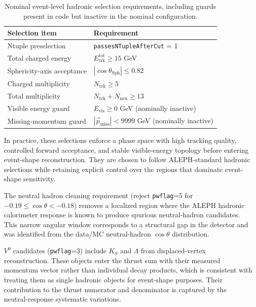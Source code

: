 \begin{table}[t!]
\centering
\begin{tabular}{@{}p{}p{}@{}}
\hline
Selection item & Requirement \\
\hline
Ntuple preselection & \texttt{passesNTupleAfterCut} = 1 \\
Total charged energy & $E_{\mathrm{trk}}^{\mathrm{tot}}\ge 15$ GeV \\
Sphericity-axis acceptance & $|\cos\theta_{\mathrm{Sph}}|\le 0.82$ \\
Charged multiplicity & $N_{\mathrm{trk}}\ge 5$ \\
Total multiplicity & $N_{\mathrm{trk}}+N_{\mathrm{neu}}\ge 13$ \\
Visible energy guard & $E_{\mathrm{vis}}\ge 0$ GeV (nominally inactive) \\
Missing-momentum guard & $|\vec{p}_{\mathrm{miss}}|<9999$ GeV (nominally inactive) \\
\hline
\end{tabular}
\caption{Nominal event-level hadronic selection requirements, including guards present in code but inactive in the nominal configuration.}
\label{tab:event_selection_summary}
\end{table}

In practice, these selections enforce a phase space with high tracking quality, controlled forward
acceptance, and stable visible-energy topology before entering event-shape reconstruction. They are
chosen to follow ALEPH-standard hadronic selections while retaining explicit control over the
regions that dominate event-shape sensitivity.

\label{sec:neutral_hadron_cleaning}%
The neutral hadron cleaning requirement (reject \texttt{pwflag}=5 for $-0.19\le\cos\theta<-0.18$) removes a localized region where the ALEPH hadronic calorimeter response is known to produce spurious neutral-hadron candidates. This narrow angular window corresponds to a structural gap in the detector and was identified from the data/MC neutral-hadron $\cos\theta$ distribution.

$V^0$ candidates (\texttt{pwflag}=3) include $K_S$ and $\Lambda$ from displaced-vertex reconstruction. These objects enter the thrust sum with their measured momentum vector rather than individual decay products, which is consistent with treating them as single hadronic objects for event-shape purposes. Their contribution to the thrust numerator and denominator is captured by the neutral-response systematic variations.

